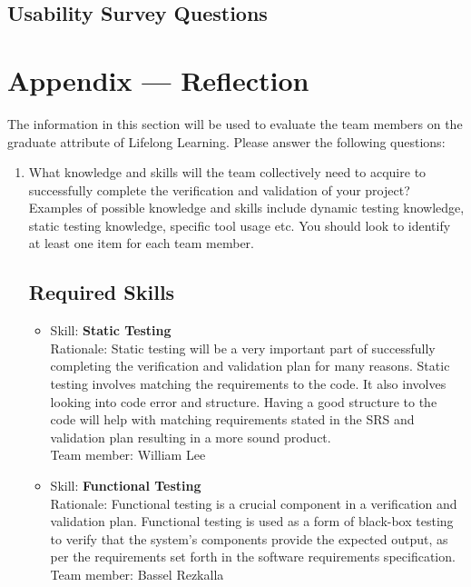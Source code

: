 \documentclass[12pt, titlepage]{article}
\begin{document}
	\subsection{Usability Survey Questions}
	
	\newpage{}
	\section*{Appendix --- Reflection}
	
	The information in this section will be used to evaluate the team members on the
	graduate attribute of Lifelong Learning.  Please answer the following questions:
	
	\begin{enumerate}
		\item What knowledge and skills will the team collectively need to acquire to
		successfully complete the verification and validation of your project?
		Examples of possible knowledge and skills include dynamic testing knowledge,
		static testing knowledge, specific tool usage etc.  You should look to
		identify at least one item for each team member.
		\subsection{Required Skills}
		\begin{itemize}
			\item Skill: \textbf{Static Testing}
			\\ Rationale: Static testing will be a very important part of successfully completing the verification and validation plan for many reasons. Static testing involves matching the requirements to the code. It also involves looking into code error and structure. Having a good structure to the code will help with matching requirements stated in the SRS and validation plan resulting in a more sound product.
			\\ Team member: William Lee
			
			\item Skill: \textbf{Functional Testing}
			\\ Rationale: Functional testing is a crucial component in a verification and validation plan. Functional testing is used as a form of black-box testing to verify that the system's components provide the expected output, as per the requirements set forth in the software requirements specification.
			\\ Team member: Bassel Rezkalla


\end{itemize}
\end{enumerate}
\end{document}
